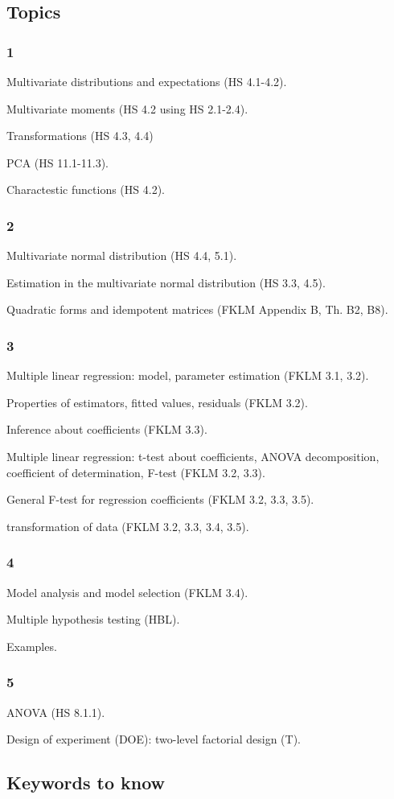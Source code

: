 \subsection{Topics}
\subsubsection{1}
Multivariate distributions and expectations (HS 4.1-4.2).

Multivariate moments (HS 4.2 using HS 2.1-2.4).

Transformations (HS 4.3, 4.4)

PCA (HS 11.1-11.3).

Charactestic functions (HS 4.2). 


\subsubsection{2}
Multivariate normal distribution (HS 4.4, 5.1).

Estimation in the multivariate normal distribution (HS 3.3, 4.5).

Quadratic forms and idempotent matrices (FKLM Appendix B, Th. B2, B8).


\subsubsection{3}
Multiple linear regression: model, parameter estimation (FKLM 3.1, 3.2).

Properties of estimators, fitted values, residuals (FKLM 3.2). 

Inference about coefficients (FKLM 3.3).

Multiple linear regression: t-test about coefficients, ANOVA decomposition, coefficient of determination, F-test (FKLM 3.2, 3.3).

General F-test for regression coefficients (FKLM 3.2, 3.3, 3.5).

transformation of data (FKLM 3.2, 3.3, 3.4, 3.5).



\subsubsection{4}
Model analysis and model selection (FKLM 3.4).

Multiple hypothesis testing (HBL).

Examples.


\subsubsection{5}
ANOVA (HS 8.1.1). 

Design of experiment (DOE): two-level factorial design (T).

\subsection{Keywords to know}
